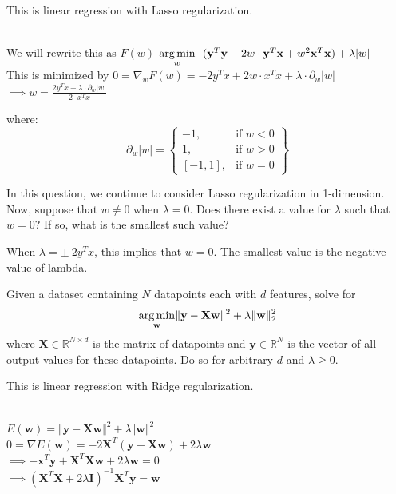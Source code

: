 This is linear regression with Lasso regularization.

\begin{subsolution}
  \\
  We will rewrite this as $F(w)$ $\underset{w}{\operatorname{arg\,min}} 
  \ \ (\mathbf{y}^T\mathbf{y} - 2w\cdot\mathbf{y}^T\mathbf{x} + w^2\mathbf{x}^T\mathbf{x}) + \lambda\vert{w}\vert$ \\

  This is minimized by $0 = \nabla_{w}F(w) = -2y^Tx + 2w\cdot x^Tx + \lambda\cdot\partial_{w}\vert{w}\vert$ \\ 
  $\implies w = \frac{2y^Tx + \lambda\cdot\partial_{w}\vert{w}\vert}{2\cdot{x^T}{x}}$

  where: 
  \begin{equation}
    \partial_{w}\vert{w}\vert = 
    \left\{
        \begin{array}{lr}
            -1, & \text{if } w < 0 \\
            1, & \text{if } w > 0 \\
            \left[-1, 1\right], & \text{if } w = 0
        \end{array}
    \right\}
  \end{equation}

\end{subsolution}

\subproblem
In this question, we continue to consider Lasso regularization in 1-dimension. Now, suppose that $w \neq 0$ when $\lambda = 0$. Does there exist a value for $\lambda$ such that $w = 0$? If so, what is the smallest such value?

\begin{subsolution}
  When $\lambda = \pm \ 2y^Tx$, this implies that $w = 0$. The smallest value is the negative value of lambda.
\end{subsolution}

\problem[7]
\subproblem
Given a dataset containing $N$ datapoints each with $d$ features, solve for
\[\underset{\mathbf{w}}{\operatorname{arg\,min}} \Vert\mathbf{y} - \mathbf{X}\mathbf{w}\Vert^2 + \lambda\Vert\mathbf{w}\Vert_2^2
\]
where $\mathbf{X} \in \mathbb{R}^{N \times d}$ is the matrix of datapoints and $\mathbf{y} \in \mathbb{R}^N$ is the  vector of all output values for these datapoints. Do so for arbitrary $d$ and $\lambda \geq 0$.

This is linear regression with Ridge regularization.

\begin{subsolution}
  \\
  $ E(\mathbf{w}) = \Vert{\mathbf{y} - \mathbf{X}\mathbf{w}}\Vert^2 + \lambda\Vert\mathbf{w}\Vert^2$ \\
  $ 0 = \nabla{E(\mathbf{w})} = -2\mathbf{X}^T(\mathbf{y} - \mathbf{X}\mathbf{w}) + 2\lambda{\mathbf{w}}$ \\
  $\implies -\mathbf{x}^T\mathbf{y} + \mathbf{X}^T\mathbf{Xw} + 2\lambda\mathbf{w} = 0$
  \\ $\implies (\mathbf{X}^T\mathbf{X} + 2\lambda\mathbf{I})^{-1}\mathbf{X}^T\mathbf{y} = \mathbf{w}$ \\
\end{subsolution}


